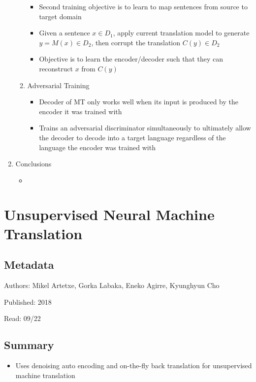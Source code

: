 \documentclass{article}
\begin{document}
\begin{enumerate}
\begin{enumerate}
		\begin{itemize}
			\item Second training objective is to learn to map sentences from source to target domain
			\item Given a sentence $x \in D_1$, apply current translation model to generate $y = M(x) \in D_2$, then corrupt the translation $C(y) \in D_2$
			\item Objective is to learn the encoder/decoder such that they can reconstruct $x$ from $C(y)$
		\end{itemize}
		\item Adversarial Training
		\begin{itemize}
			\item Decoder of MT only works well when its input is produced by the encoder it was trained with
			\item Trains an adversarial discriminator simultaneously to ultimately allow the decoder to decode into a target language regardless of the language the encoder was trained with
		\end{itemize}
	\end{enumerate}
	\item Conclusions
	\begin{itemize}
		\item 
	\end{itemize}
\end{enumerate}

\pagebreak


\section*{Unsupervised Neural Machine Translation}

\subsection*{Metadata}

\noindent Authors: Mikel Artetxe, Gorka Labaka, Eneko Agirre, Kyunghyun Cho

\noindent Published: 2018

\noindent Read: 09/22

\subsection*{Summary}
\begin{itemize}
	\item Uses denoising auto encoding and on-the-fly back translation for unsupervised machine translation
\end{itemize}
\end{document}
